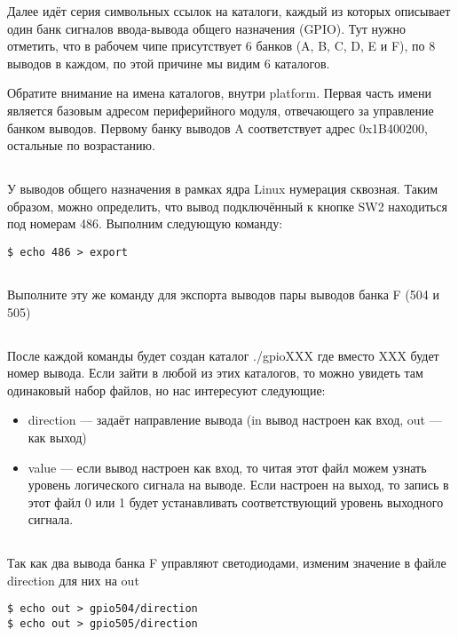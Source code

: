 Далее идёт серия символьных ссылок на каталоги, каждый из которых описывает один банк сигналов ввода-вывода общего назначения (GPIO). Тут нужно отметить, что в рабочем чипе присутствует 6 банков (A, B, C, D, E и F), по 8 выводов в каждом, по этой причине мы видим 6 каталогов.  

Обратите внимание на имена каталогов, внутри platform. Первая часть имени является базовым адресом периферийного модуля, отвечающего за управление банком выводов. Первому банку выводов A соответствует адрес 0x1B400200, остальные по возрастанию. 

\subsection{}У выводов общего назначения в рамках ядра Linux нумерация сквозная. Таким образом, можно определить, что вывод подключённый к кнопке SW2 находиться под номерам 486.  Выполним следующую команду:
\begin{lstlisting}[style=bash]
$ echo 486 > export
\end{lstlisting}

\subsection{}Выполните эту же команду для экспорта выводов пары выводов банка F (504 и 505) 

\subsection{}После каждой команды будет создан каталог ./gpioXXX где вместо XXX будет номер вывода. Если зайти в любой из этих каталогов, то можно увидеть там одинаковый набор файлов, но нас интересуют следующие: 
\begin{itemize}
\item direction — задаёт направление вывода (in вывод настроен как вход, out — как выход)
\item value — если вывод настроен как вход, то читая этот файл можем узнать уровень логического сигнала на выводе. Если настроен на выход, то запись в этот файл 0 или 1 будет устанавливать соответствующий уровень выходного сигнала.
\end{itemize}

\subsection{}Так как два вывода банка F управляют светодиодами, изменим значение в файле direction  для них на out
\begin{lstlisting}[style=bash]
$ echo out > gpio504/direction
$ echo out > gpio505/direction
\end{lstlisting}

